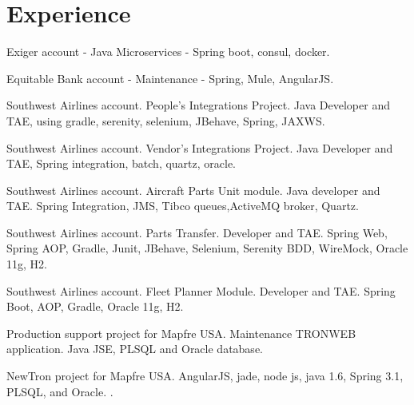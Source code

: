 \documentclass[]{deedy-resume-openfont}
\begin{document}
\begin{minipage}[t]{0.66\textwidth} 


\section{Experience}

\vspace{\topsep} %
\begin{tightemize}
\item Exiger account - Java Microservices - Spring boot, consul, docker.
\item Equitable Bank account - Maintenance - Spring, Mule, AngularJS.
\end{tightemize}
\sectionsep

\begin{tightemize}
\item Southwest Airlines account. People's Integrations Project. Java Developer and TAE, using gradle, serenity, selenium, JBehave, Spring, JAXWS. 
\item Southwest Airlines account. Vendor's Integrations Project. Java Developer and TAE, Spring integration, batch, quartz, oracle.  
\item Southwest Airlines account. Aircraft Parts Unit module. Java developer and TAE. Spring Integration, JMS, Tibco queues,ActiveMQ broker, Quartz.
\item Southwest Airlines account. Parts Transfer. Developer and TAE. Spring Web, Spring AOP, Gradle, Junit, JBehave, Selenium, Serenity BDD, WireMock, Oracle 11g, H2.
\item Southwest Airlines account. Fleet Planner Module. Developer and TAE. Spring Boot, AOP, Gradle, Oracle 11g, H2.\end{tightemize}
\sectionsep

\begin{tightemize}
\item Production support project for Mapfre USA. Maintenance TRONWEB application. Java JSE, PLSQL and Oracle database.
\item NewTron project for Mapfre USA. AngularJS, jade, node js, java 1.6, Spring 3.1, PLSQL, and Oracle.
.\end{tightemize}
\sectionsep


\end{minipage}
\end{document}
